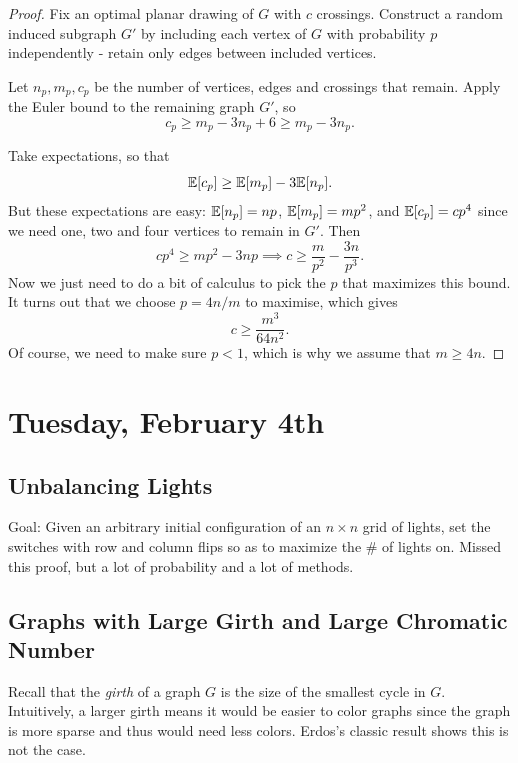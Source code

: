 \documentclass[11 pt]{scrartcl}
\begin{document}
\begin{proof}
    Fix an optimal planar drawing of $G$ with $c$ crossings. Construct a random induced subgraph $G'$ by including each vertex of $G$ with probability $p$ independently - retain only edges between included vertices. 

    Let $n_p, m_p, c_p$ be the number of vertices, edges and crossings that remain. Apply the Euler bound to the remaining graph $G'$, so
    \[ c_p \geq m_p - 3n_p + 6 \geq m_p - 3n_p.\] 
    
    Take expectations, so that 
    \[ \mathbb E[c_p] \geq \mathbb E[m_p] - 3\mathbb E[n_p].\] 
    But these expectations are easy: $\mathbb E[n_p] = np$, $\mathbb E[m_p] = mp^2$, and $\mathbb E[c_p] = cp^4$ since we need one, two and four vertices to remain in $G'$. Then 
    \[ cp^4 \geq mp^2 - 3np \implies c \geq \dfrac{m}{p^2} - \dfrac{3n}{p^3}.\] 
    Now we just need to do a bit of calculus to pick the $p$ that maximizes this bound. It turns out that we choose $p = 4n/m$ to maximise, which gives 
    \[ c \geq \dfrac{m^3}{64n^2}.\] 
    Of course, we need to make sure $p < 1$, which is why we assume that $m \geq 4n$. 
\end{proof}

\newpage
\section{Tuesday, February 4th}
\subsection{Unbalancing Lights}
Goal: Given an arbitrary initial configuration of an $n\times n$ grid of lights,  set the switches with row and column flips so as to maximize the \# of lights on. Missed this proof, but a lot of probability and a lot of methods.  


\subsection{Graphs with Large Girth and Large Chromatic Number}
Recall that the \emph{girth} of a graph $G$ is the size of the smallest cycle in $G$. Intuitively, a larger girth means it would be easier to color graphs since the graph is more sparse and thus would need less colors. Erdos's classic result shows this is not the case. 
\end{document}
